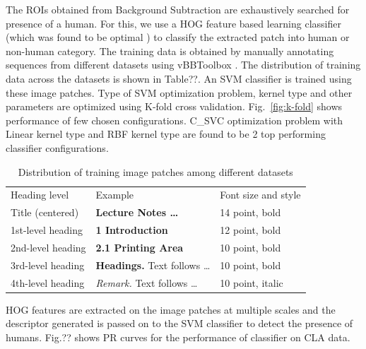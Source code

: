 \documentclass[runningheads]{llncs}
\begin{document}
The ROIs obtained from Background Subtraction are exhaustively searched for presence of a human. For this, we use a HOG feature based learning classifier (which was found to be optimal \cite{portmann2014people}) to classify the extracted patch into human or non-human category. The training data is obtained by manually annotating sequences from different datasets using vBBToolbox \cite{PMT}. The distribution of training data across the datasets is shown in Table??. An SVM classifier is trained using these image patches. Type of SVM optimization problem, kernel type and other parameters are optimized using K-fold cross validation. Fig.~\ref{fig:k-fold} shows performance of few chosen configurations. C\_SVC optimization problem with Linear kernel type and RBF kernel type are found to be 2 top performing classifier configurations. 

\begin{table}
\begin{center}
\label{table:headings}
\begin{tabular}{lll}
\hline\noalign{\smallskip}
Heading level & Example & Font size and style\\
\noalign{\smallskip}
\hline
\noalign{\smallskip}
Title (centered)  & {\Large \bf Lecture Notes \dots} & 14 point, bold\\
1st-level heading & {\large \bf 1 Introduction} & 12 point, bold\\
2nd-level heading & {\bf 2.1 Printing Area} & 10 point, bold\\
3rd-level heading & {\bf Headings.} Text follows \dots & 10 point, bold
\\
4th-level heading & {\it Remark.} Text follows \dots & 10 point,
italic\\
\hline
\end{tabular}
\end{center}
\caption{Distribution of training image patches among different datasets}
\end{table}

HOG features are extracted on the image patches at multiple scales and the descriptor generated is passed on to the SVM classifier to detect the presence of humans. Fig.?? shows PR curves for the performance of classifier on CLA data.
\end{document}
